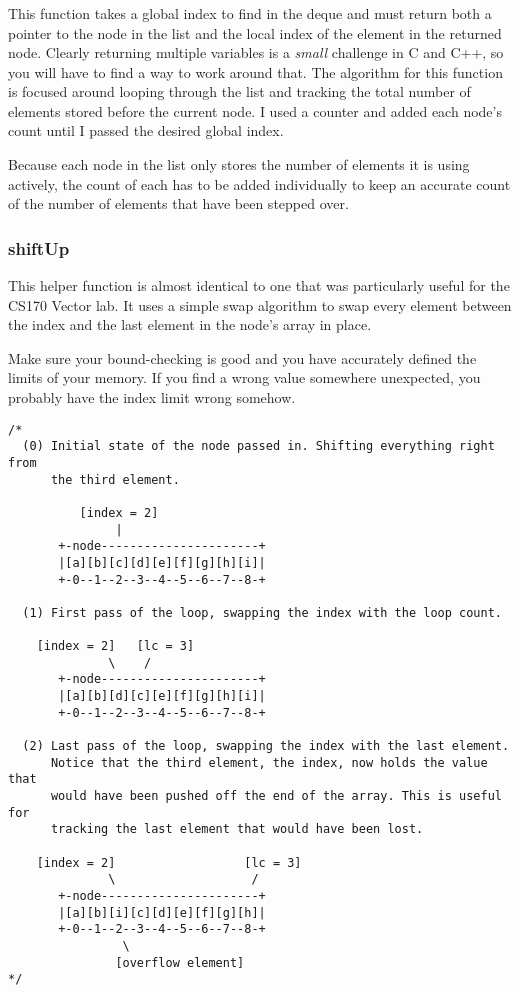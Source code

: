 \subsubsection{}

\indent This function takes a global index to find in the deque and must return
both a pointer to the node in the list and the local index of the element in the returned node.
Clearly returning multiple variables is a  \textit{small} challenge in C and C++,
so you will have to find a way to work around that.
The algorithm for this function is focused around looping through the list
and tracking the total number of elements stored before the current
node. I used a counter and added each node's count until I passed the
desired global index.

\indent Because each node in the list only stores the number of elements it is
using actively, the count of each has to be added individually to keep an
accurate count of the number of elements that have been stepped over.


\subsubsection{shiftUp}
\indent This helper function is almost identical to one that was particularly
useful for the CS170 Vector lab. It uses a simple swap algorithm to swap
every element between the index and the last element in the node's array
in place.

\indent Make sure your bound-checking is good and you have accurately defined the
limits of your memory. If you find a wrong value somewhere unexpected,
you probably have the index limit wrong somehow.

\pagebreak
\begin{verbatim}
/*
  (0) Initial state of the node passed in. Shifting everything right from
      the third element.

          [index = 2]
               |
       +-node----------------------+
       |[a][b][c][d][e][f][g][h][i]|
       +-0--1--2--3--4--5--6--7--8-+

  (1) First pass of the loop, swapping the index with the loop count.

    [index = 2]   [lc = 3]
              \    /
       +-node----------------------+
       |[a][b][d][c][e][f][g][h][i]|
       +-0--1--2--3--4--5--6--7--8-+

  (2) Last pass of the loop, swapping the index with the last element.
      Notice that the third element, the index, now holds the value that
      would have been pushed off the end of the array. This is useful for
      tracking the last element that would have been lost.

    [index = 2]                  [lc = 3]
              \                   /
       +-node----------------------+
       |[a][b][i][c][d][e][f][g][h]|
       +-0--1--2--3--4--5--6--7--8-+
                \
               [overflow element]
*/
\end{verbatim}


